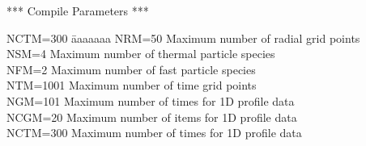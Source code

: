 \documentclass[11pt]{jarticle}
\begin{document}
\begin{center}
*** Compile Parameters ***
\\
\begin{tabbing}
NCTM=300  \= aaaaaaa \kill
NRM=50    \> Maximum number of radial grid points \\
NSM=4     \> Maximum number of thermal particle species \\
NFM=2     \> Maximum number of fast particle species \\
NTM=1001  \> Maximum number of time grid points \\
NGM=101   \> Maximum number of times for 1D profile data \\
NCGM=20   \> Maximum number of items for 1D profile data \\
NCTM=300  \> Maximum number of times for 1D profile data
\end{tabbing}
\end{center}
\end{document}
